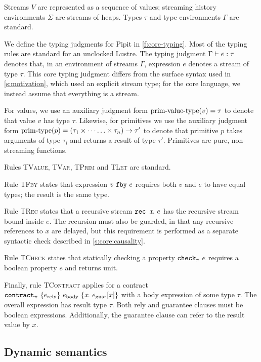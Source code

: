 Streams $V$ are represented as a sequence of values; streaming history environments $\Sigma$ are streams of heaps.
Types $\tau$ and type environments $\Gamma$ are standard.



We define the typing judgments for Pipit in \autoref{f:core-typing}.
Most of the typing rules are standard for an unclocked Lustre.
The typing judgment $\Gamma \vdash e : \tau$ denotes that, in an environment of streams $\Gamma$, expression $e$ denotes a stream of type $\tau$.
This core typing judgment differs from the surface syntax used in \autoref{s:motivation}, which used an explicit stream type; for the core language, we instead assume that everything is a stream.

For values, we use an auxiliary judgment form $\text{prim-value-type}(v) = \tau$ to denote that value $v$ has type $\tau$.
Likewise, for primitives we use the auxiliary judgment form $\text{prim-type}(p) = (\tau_1 \times \cdots \hdots \times \tau_n) \to \tau'$ to denote that primitive $p$ takes arguments of type $\tau_i$ and returns a result of type $\tau'$.
Primitives are pure, non-streaming functions.

Rules \textsc{TValue}, \textsc{TVar}, \textsc{TPrim} and \textsc{TLet} are standard.

Rule \textsc{TFby} states that expression $v~\texttt{fby}~e$ requires both $v$ and $e$ to have equal types; the result is the same type.

Rule \textsc{TRec} states that a recursive stream $\texttt{rec~} x\hspace{-0.1em}.~e$ has the recursive stream bound inside $e$.
The recursion must also be guarded, in that any recursive references to $x$ are delayed, but this requirement is performed as a separate syntactic check described in \autoref{s:core:causality}.

Rule \textsc{TCheck} states that statically checking a property $\texttt{check}_{\pi}~e$ requires a boolean property $e$ and returns unit.

Finally, rule \textsc{TContract} applies for a contract $\texttt{contract}_{\pi}~\{e_{\text{rely}}\}~e_{\text{body}}~\{x\hspace{-0.1em}.~e_{\text{guar}}[x]\}$ with a body expression of some type $\tau$.
The overall expression has result type $\tau$.
Both rely and guarantee clauses must be boolean expressions.
Additionally, the guarantee clause can refer to the result value by $x$.

\subsection{Dynamic semantics}
\label{s:core:dynamic}


